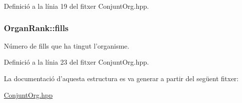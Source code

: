 Definició a la línia 19 del fitxer Conjunt\-Org.\-hpp.

\hypertarget{struct_organ_rank_ac822919ccf32979e8c4d8384a1949b08}{
\subsubsection[{fills}]{\setlength{\rightskip}{0pt plus 5cm}Organ\-Rank\-::fills}}\label{struct_organ_rank_ac822919ccf32979e8c4d8384a1949b08}


Número de fills que ha tingut l'organisme. 



Definició a la línia 23 del fitxer Conjunt\-Org.\-hpp.



La documentació d'aquesta estructura es va generar a partir del següent fitxer\-:\begin{DoxyCompactItemize}
\item 
\hyperlink{_conjunt_org_8hpp}{Conjunt\-Org.\-hpp}\end{DoxyCompactItemize}
